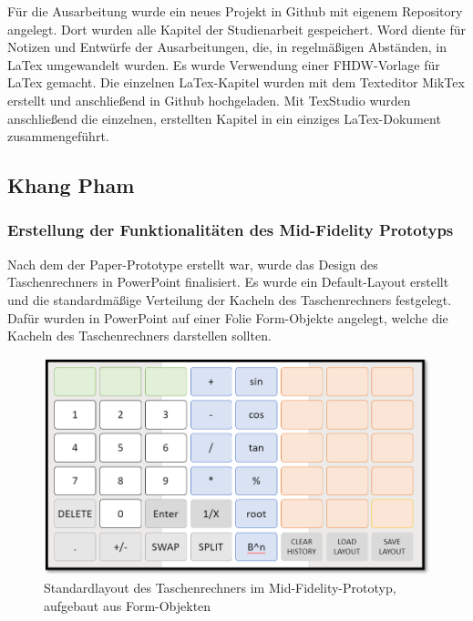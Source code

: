 Für die Ausarbeitung wurde ein neues Projekt in Github mit eigenem Repository angelegt. Dort wurden alle Kapitel der Studienarbeit gespeichert. Word diente für Notizen und Entwürfe der Ausarbeitungen, die, in regelmäßigen Abständen, in LaTex umgewandelt wurden. Es wurde Verwendung einer FHDW-Vorlage für LaTex gemacht. Die einzelnen LaTex-Kapitel wurden mit dem Texteditor MikTex erstellt und anschließend in Github hochgeladen. Mit TexStudio wurden anschließend die einzelnen, erstellten Kapitel in ein einziges LaTex-Dokument zusammengeführt.  


\subsection{Khang Pham}

\subsubsection{Erstellung der Funktionalitäten des Mid-Fidelity Prototyps}
\label{subsubsection:erstellung-funktionalitäten-mid-fidelity}

Nach dem der Paper-Prototype erstellt war, wurde das Design des Taschenrechners in PowerPoint finalisiert. Es wurde ein Default-Layout erstellt und die standardmäßige Verteilung der Kacheln des Taschenrechners festgelegt. Dafür wurden in PowerPoint auf einer Folie Form-Objekte angelegt, welche die Kacheln des Taschenrechners darstellen sollten.

\begin{figure}[!h]
	\includegraphics[scale=1]{img/standardlayout-mid-fielty}
	\caption[Standardlayout des Taschenrechners im Mid-Fidelity-Prototyp, aufgebaut aus Form-Objekten]{Standardlayout des Taschenrechners im Mid-Fidelity-Prototyp, aufgebaut aus Form-Objekten\footnotemark}
\end{figure}

